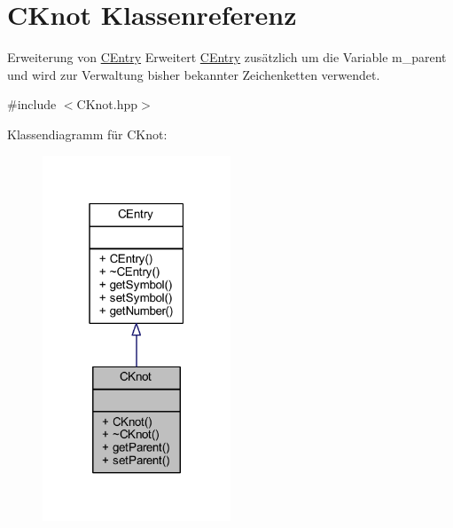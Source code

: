 \hypertarget{class_c_knot}{}\section{C\+Knot Klassenreferenz}
\label{class_c_knot}


Erweiterung von \hyperlink{class_c_entry}{C\+Entry} Erweitert \hyperlink{class_c_entry}{C\+Entry} zusätzlich um die Variable m\+\_\+parent und wird zur Verwaltung bisher bekannter Zeichenketten verwendet.  




{\ttfamily \#include $<$C\+Knot.\+hpp$>$}



Klassendiagramm für C\+Knot\+:
\nopagebreak
\begin{figure}[H]
\begin{center}
\leavevmode
\includegraphics[width=159pt]{class_c_knot__inherit__graph}
\end{center}
\end{figure}


